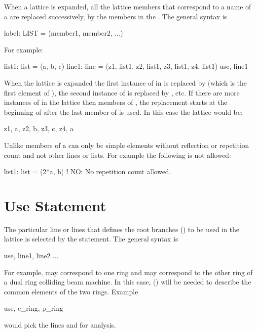 When a lattice is expanded, all the lattice members that correspond to
a name of a  are replaced successively, by the
members in the . The general syntax is
\begin{example}
  label: LIST = (member1, member2, ...)
\end{example}
For example:
\begin{example}
  list1: list = (a, b, c)
  line1: line = (z1, list1, z2, list1, z3, list1, z4, list1)
  use, line1
\end{example}
When the lattice is expanded the first instance of  in
 is replaced by  (which is the first element of
), the second instance of  is replaced by ,
etc. If there are more instances of  in the lattice then
members of , the replacement starts at the beginning of
 after the last member of  is used. In this case the
lattice would be:
\begin{example}
  z1, a, z2, b, z3, c, z4, a
\end{example}
Unlike \mad members of a  can only be simple elements 
without reflection or repetition count and not other lines or lists. 
For example the following is not allowed:
\begin{example}
  list1: list = (2*a, b)  ! NO: No repetition count allowed.
\end{example}

\section{Use Statement}
\label{s:use}

The particular line or lines that defines the root branches
() to be used in the lattice is selected by the
 statement. The general syntax is
\begin{example}
  use, line1, line2 ...
\end{example}
For example,  may correspond to one ring and  may
correspond to the other ring of a dual ring colliding beam machine. In
this case,  () will be needed to
describe the common elements of the two rings. Example
\begin{example}
  use, e_ring, p_ring
\end{example}
would pick the lines  and  for analysis. 

